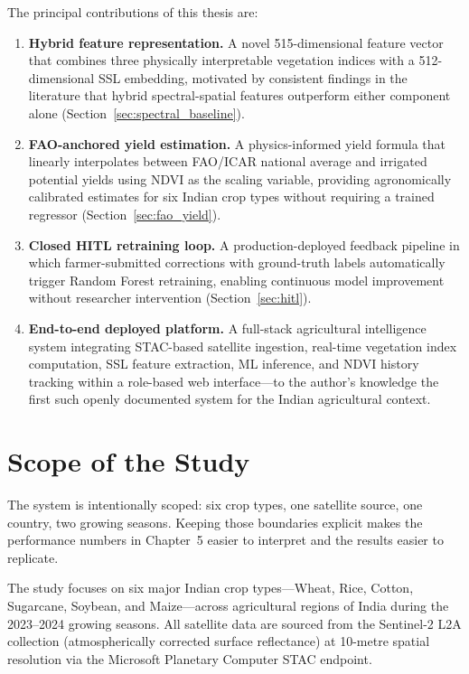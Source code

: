 \documentclass[12pt,a4paper,oneside]{report}
\begin{document}
The principal contributions of this thesis are:

\begin{enumerate}
  \item \textbf{Hybrid feature representation.} A novel 515-dimensional feature vector
        that combines three physically interpretable vegetation indices with a
        512-dimensional SSL embedding, motivated by consistent findings in the
        literature that hybrid spectral-spatial features outperform either component
        alone \cite{liakos2018machine, kussul2017deep} (Section~\ref{sec:spectral_baseline}).

  \item \textbf{FAO-anchored yield estimation.} A physics-informed yield formula that
        linearly interpolates between FAO/ICAR national average and irrigated potential
        yields using NDVI as the scaling variable, providing agronomically calibrated
        estimates for six Indian crop types without requiring a trained regressor
        (Section~\ref{sec:fao_yield}).

  \item \textbf{Closed HITL retraining loop.} A production-deployed feedback pipeline
        in which farmer-submitted corrections with ground-truth labels automatically
        trigger Random Forest retraining, enabling continuous model improvement
        without researcher intervention (Section~\ref{sec:hitl}).

  \item \textbf{End-to-end deployed platform.} A full-stack agricultural intelligence
        system integrating STAC-based satellite ingestion, real-time vegetation index
        computation, SSL feature extraction, ML inference, and NDVI history tracking
        within a role-based web interface—to the author's knowledge the first such
        openly documented system for the Indian agricultural context.
\end{enumerate}

\section{Scope of the Study}

The system is intentionally scoped: six crop types, one satellite source, one country, two growing seasons. Keeping those boundaries explicit makes the performance numbers in Chapter~5 easier to interpret and the results easier to replicate.

The study focuses on six major Indian crop types—Wheat, Rice, Cotton, Sugarcane,
Soybean, and Maize—across agricultural regions of India during the 2023--2024 growing
seasons. All satellite data are sourced from the Sentinel-2 L2A collection
(atmospherically corrected surface reflectance) at 10-metre spatial resolution via
the Microsoft Planetary Computer STAC endpoint.
\end{document}
